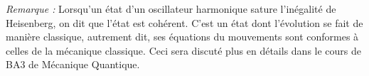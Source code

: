 \documentclass{article}
\begin{document}
\textit{Remarque :} Lorsqu'un état d'un oscillateur harmonique sature l'inégalité de Heisenberg, on dit que l'état est cohérent. C'est un état dont l'évolution se fait de manière classique, autrement dit, ses équations du mouvements sont conformes à celles de la mécanique classique. Ceci sera discuté plus en détails dans le cours de BA3 de Mécanique Quantique.
\end{document}
